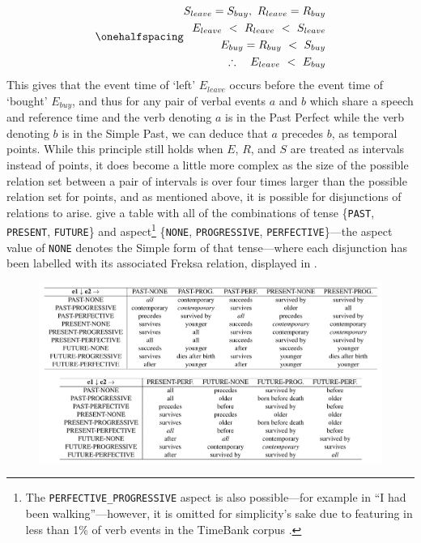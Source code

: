 \documentclass[a4paper,12pt,leqno]{article}
\begin{document}
\begin{subequations}\label{ex:permanent-ref}
	\onehalfspacing
	\begin{align}
		S_{leave} = S_{buy},~ R_{leave} = R_{buy}\\
		E_{leave} ~<~ R_{leave} ~<~ S_{leave}\\
		E_{buy} = R_{buy} ~<~ S_{buy}\\
		\therefore~~~ E_{leave} ~<~ E_{buy}
	\end{align}
\end{subequations}
This gives that the event time of `left' $E_{leave}$ occurs before the event time of `bought' $E_{buy}$, and thus for any pair of verbal events $a$ and $b$ which share a speech and reference time and the verb denoting $a$ is in the Past Perfect while the verb denoting $b$ is in the Simple Past, we can deduce that $a$ precedes $b$, as temporal points. While this principle still holds when $E$, $R$, and $S$ are treated as intervals instead of points, it does become a little more complex as the size of the possible relation set between a pair of intervals is over four times larger than the possible relation set for points, and as mentioned above, it is possible for disjunctions of relations to arise. \citet{Derczynski2013} give a table with all of the combinations of tense \{\texttt{PAST}, \texttt{PRESENT}, \texttt{FUTURE}\} and aspect\footnote{The \texttt{PERFECTIVE\_PROGRESSIVE} aspect is also possible---for example in ``I had been walking''---however, it is omitted for simplicity's sake due to featuring in less than 1\% of verb events in the TimeBank corpus \citep[p. 77]{Derczynski2013}.} \{\texttt{NONE}, \texttt{PROGRESSIVE}, \texttt{PERFECTIVE}\}---the aspect value of \texttt{NONE} denotes the Simple form of that tense---where each disjunction has been labelled with its associated Freksa relation, displayed in .
\begin{center}
	\begin{figure}[h!]
		\includegraphics[width=\textwidth]{images/tense-aspect-freksa}
		\label{fig:tense-aspect-freksa}
	\end{figure}
\end{center}
\end{document}
